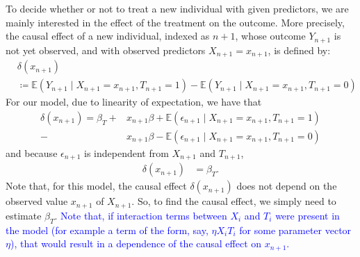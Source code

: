 \documentclass[preprint,12pt]{elsarticle}
\newcommand{\added}[1]{\textcolor{blue}{#1}}
\begin{document}
To decide whether or not to treat a new individual with given predictors,
we are mainly interested in the effect of the treatment on the outcome.
More precisely, the causal effect of a new individual, indexed as $n+1$,
whose outcome $Y_{n+1}$ is not yet observed, and with observed predictors $X_{n+1}=x_{n+1}$, is defined by:
\begin{align}
  &\delta(x_{n+1})\nonumber\\
  &\coloneqq\mathbb{E}(Y_{n+1}\mid X_{n+1}=x_{n+1},T_{n+1} =1) - \mathbb{E}(Y_{n+1}\mid X_{n+1}=x_{n+1},T_{n+1}=0)
\end{align}
For our model, due to linearity of expectation, we have that
\begin{align}
  \delta(x_{n+1})
  =\beta_T+&x_{n+1}\beta+\mathbb{E}(\epsilon_{n+1}\mid X_{n+1}=x_{n+1},T_{n+1} =1) \nonumber\\
  - &x_{n+1}\beta-\mathbb{E}(\epsilon_{n+1}\mid X_{n+1}=x_{n+1},T_{n+1} =0)
  \end{align}
  {and because $\epsilon_{n+1}$ is independent from $X_{n+1}$ and $T_{n+1}$,}
  \begin{align}
  \delta(x_{n+1})
  &=\beta_{T}.
\end{align}
Note that, for this model, the causal effect $\delta(x_{n+1})$
does not depend on the observed value $x_{n+1}$ of $X_{n+1}$.
So, to find the causal effect, we simply need to estimate $\beta_T$.
\added{%
Note that, if interaction terms between $X_i$ and $T_i$ were present in
the model (for example a term of the form, say, $\eta X_iT_i$ for some
parameter vector $\eta$), that would result in a dependence of the
causal effect on $x_{n+1}$.%
}
\end{document}
